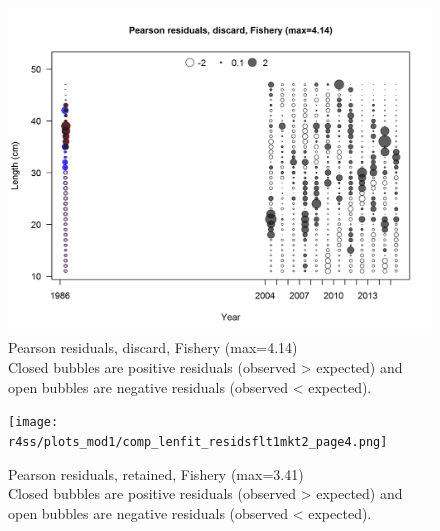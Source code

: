 \documentclass[12pt,]{article}
\begin{document}
\begin{figure}
\centering
\includegraphics{r4ss/plots_mod1/comp_lenfit_residsflt1mkt1.png}
\caption{Pearson residuals, discard, Fishery (max=4.14)\\
Closed bubbles are positive residuals (observed \textgreater{} expected)
and open bubbles are negative residuals (observed \textless{} expected).
\label{fig:discard_len_pearson}}
\end{figure}

\begin{figure}
\centering
\texttt{[image: r4ss/plots\_mod1/comp\_lenfit\_residsflt1mkt2\_page4.png]}
\caption{Pearson residuals, retained, Fishery (max=3.41)\\
Closed bubbles are positive residuals (observed \textgreater{} expected)
and open bubbles are negative residuals (observed \textless{} expected).
\label{fig:fishery_len_pearson}}
\end{figure}
\end{document}
